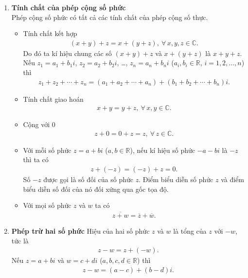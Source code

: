 \begin{enumerate}[\bf a)]
	\item \textbf{Tính chất của phép cộng số phức}\\
	Phép cộng số phức có tất cả các tính chất của phép cộng số thực.
	\begin{itemize}
		\item Tính chất kết hợp
		\begin{align*}
		(x+y)+z=x+(y+z),\ \forall\, x,y,z\in\mathbb{C}.
		\end{align*}
		Do đó ta kí hiệu chung các số $(x+y)+z$ và $x+(y+z)$ là $x+y+z$.\\
		Nếu $z_1=a_1+b_1i$, $z_2=a_2+b_2i$, \ldots, $z_n=a_n+b_ni$ ($a_i,b_i\in\mathbb{R}$, $i=1,2,\ldots,n$) thì
		\begin{align*}
		z_1+z_2+\cdots +z_n= (a_1+a_2+\cdots+ a_n) + (b_1+b_2+ \cdots +b_n)i. 
		\end{align*}
		\item Tính chất giao hoán
		\begin{align*}
		x+y=y+z,\ \forall\, x,y \in\mathbb{C}.
		\end{align*}
		\item Cộng với $0$
		\begin{align*}
		z+0=0+z=z,\ \forall\, z\in\mathbb{C}.
		\end{align*}
		\item Với mỗi số phức $z=a+bi$ ($a,b \in \mathbb{R}$), nếu kí hiệu số phức $-a-bi$ là $-z$ thì ta có
		\begin{align*}
		z+(-z)=(-z)+z=0.
		\end{align*}
		Số $-z$ được gọi là số đối của số phức $z$. Điểm biểu diễn số phức $z$ và điểm biểu diễn số đối của nó đối xứng qua gốc tọa độ.
		\item Với mọi số phức $z$ và $w$ ta có
		\begin{align*}
		\overline{z+w}=\overline{z}+\overline{w}.
		\end{align*}
	\end{itemize}
	\item \textbf{Phép trừ hai số phức}
	Hiệu của hai số phức $z$ và $w$ là tổng của $z$ với $-w$, tức là
	\begin{align*}
	z-w=z+(-w).
	\end{align*}
	Nếu $z=a+bi$ và $w=c+di$ ($a,b,c,d\in\mathbb{R}$) thì 
	\begin{align*}
	z-w=(a-c)+ (b-d)i.
	\end{align*}
	

\end{enumerate}
